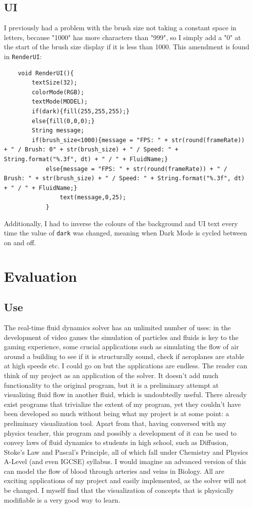 \documentclass[12pt,a4paper]{book}
\begin{document}
\section{UI}
I previously had a problem with the brush size not taking a constant space in letters, because "1000" has more characters than "999", so I simply add a "0" at the start of the brush size display if it is less than 1000. This amendment is found in \verb|RenderUI|:
\begin{lstlisting}
	void RenderUI(){
		textSize(32);
		colorMode(RGB);
		textMode(MODEL);
		if(dark){fill(255,255,255);}
		else{fill(0,0,0);}
		String message;
		if(brush_size<1000){message = "FPS: " + str(round(frameRate)) + " / Brush: 0" + str(brush_size) + " / Speed: " + String.format("%.3f", dt) + " / " + FluidName;}
			else{message = "FPS: " + str(round(frameRate)) + " / Brush: " + str(brush_size) + " / Speed: " + String.format("%.3f", dt) + " / " + FluidName;}
				text(message,0,25);
			}
\end{lstlisting}
Additionally, I had to inverse the colours of the background and UI text every time the value of \verb|dark| was changed, meaning when Dark Mode is cycled between on and off.



\chapter{Evaluation}

\section{Use}
The real-time fluid dynamics solver has an unlimited number of uses: in the development of video games the simulation of particles and fluids is key to the gaming experience, some crucial applications such as simulating the flow of air around a building to see if it is structurally sound, check if aeroplanes are stable at high speeds etc. I could go on but the applications are endless. The reader can think of my project as an application of the solver. It doesn't add much functionality to the original program, but it is a preliminary attempt at visualizing fluid flow in another fluid, which is undoubtedly useful. There already exist programs that trivialize the extent of my program, yet they couldn't have been developed so much without being what my project is at some point: a preliminary visualization tool. Apart from that, having conversed with my physics teacher, this program and possibly a development of it can be used to convey laws of fluid dynamics to students in high school, such as Diffusion, Stoke's Law and Pascal's Principle, all of which fall under Chemistry and Physics A-Level (and even IGCSE) syllabus. I would imagine an advanced version of this can model the flow of blood through arteries and veins in Biology. All are exciting applications of my project and easily implemented, as the solver will not be changed. I myself find that the visualization of concepts that is physically modifiable is a very good way to learn. 
\end{document}
